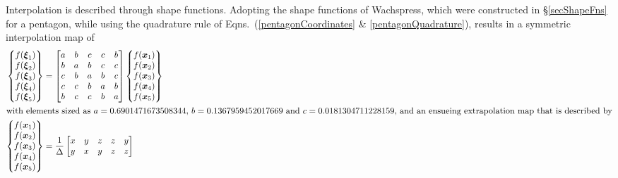 Interpolation is described through shape functions.  Adopting the shape functions of Wachspress, which were constructed in \S\ref{secShapeFns} for a pentagon, while using the quadrature rule of Eqns.~(\ref{pentagonCoordinates} \& \ref{pentagonQuadrature}), results in a symmetric interpolation map of
\begin{subequations}
    \label{extrapolationPentagon}
    \begin{align} 
    \left\{ \begin{matrix}
    f ( \boldsymbol{\xi}_1 ) \\ 
    f ( \boldsymbol{\xi}_2 ) \\ 
    f ( \boldsymbol{\xi}_3 ) \\ 
    f ( \boldsymbol{\xi}_4 ) \\ 
    f ( \boldsymbol{\xi}_5 )
    \end{matrix} \right\} & = \begin{bmatrix}
    a & b & c & c & b \\
    b & a & b & c & c \\
    c & b & a & b & c \\
    c & c & b & a & b \\
    b & c & c & b & a
    \end{bmatrix} 
    \left\{ \begin{matrix} 
    f ( \boldsymbol{x}_1 ) \\ 
    f ( \boldsymbol{x}_2 ) \\ 
    f ( \boldsymbol{x}_3 ) \\
    f ( \boldsymbol{x}_4 ) \\
    f ( \boldsymbol{x}_5 )
    \end{matrix} \right\} \\
    \intertext{with elements sized as $a = 0.6901471673508344$, $b = 0.1367959452017669$ and $c = 0.0181304711228159$, and an ensueing extrapolation map that is described by}
    \left\{ \begin{matrix} 
    f ( \boldsymbol{x}_1 ) \\ 
    f ( \boldsymbol{x}_2 ) \\ 
    f ( \boldsymbol{x}_3 ) \\
    f ( \boldsymbol{x}_4 ) \\
    f ( \boldsymbol{x}_5 )
    \end{matrix} \right\} & = \frac{1}{\Delta} \begin{bmatrix}
    x & y & z & z & y \\
    y & x & y & z & z \\

\end{bmatrix}
\end{align}
\end{subequations}
